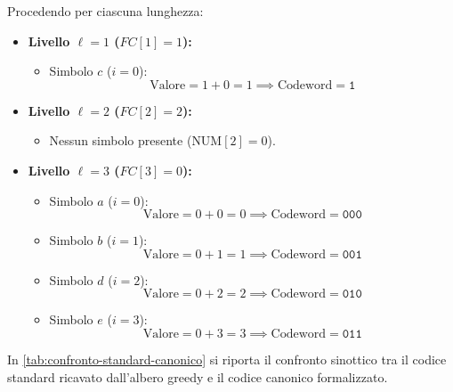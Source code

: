 Procedendo per ciascuna lunghezza:
\begin{itemize}
  \item \textbf{Livello $\ell = 1$ ($FC[1] = 1$):}
  \begin{itemize}
    \item Simbolo $c$ ($i = 0$):
    \begin{equation}
      \text{Valore} = 1 + 0 = 1 \implies \text{Codeword} = \texttt{1}
    \end{equation}
  \end{itemize}
  \item \textbf{Livello $\ell = 2$ ($FC[2] = 2$):}
  \begin{itemize}
    \item Nessun simbolo presente ($\text{NUM}[2] = 0$).
  \end{itemize}
  \item \textbf{Livello $\ell = 3$ ($FC[3] = 0$):}
  \begin{itemize}
    \item Simbolo $a$ ($i = 0$):
    \begin{equation}
      \text{Valore} = 0 + 0 = 0 \implies \text{Codeword} = \texttt{000}
    \end{equation}
    \item Simbolo $b$ ($i = 1$):
    \begin{equation}
      \text{Valore} = 0 + 1 = 1 \implies \text{Codeword} = \texttt{001}
    \end{equation}
    \item Simbolo $d$ ($i = 2$):
    \begin{equation}
      \text{Valore} = 0 + 2 = 2 \implies \text{Codeword} = \texttt{010}
    \end{equation}
    \item Simbolo $e$ ($i = 3$):
    \begin{equation}
      \text{Valore} = 0 + 3 = 3 \implies \text{Codeword} = \texttt{011}
    \end{equation}
  \end{itemize}
\end{itemize}

In \autoref{tab:confronto-standard-canonico} si riporta il confronto sinottico tra il codice standard ricavato dall'albero greedy e il codice canonico formalizzato.

